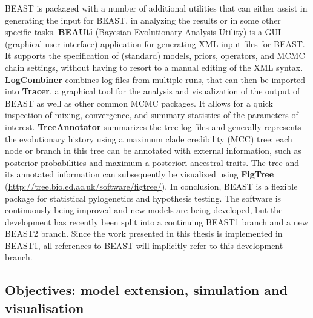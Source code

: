 BEAST is packaged with a number of additional utilities that can either assist in generating the input for BEAST, in analyzing the results or in some other specific tasks.
\textbf{BEAUti} (Bayesian Evolutionary Analysis Utility) is a  GUI (graphical user-interface) application for generating XML input files for BEAST. 
It supports the specification of (standard) models, priors, operators, and MCMC chain settings, without having to resort to a manual editing of the XML syntax.
\textbf{LogCombiner} combines log files from multiple runs, that can then be imported into \textbf{Tracer}, a graphical tool for the analysis and visualization of the output of BEAST as well as other common MCMC packages.
It allows for a quick inspection of mixing, convergence, and summary statistics of the parameters of interest.
\textbf{TreeAnnotator} summarizes the tree log files and generally represents the evolutionary history using a maximum clade credibility (MCC) tree; each node or branch in this tree can be annotated with external information, such as posterior probabilities and maximum a posteriori ancestral traits.
The tree and its annotated information can subsequently be visualized using \textbf{FigTree} (\url{http://tree.bio.ed.ac.uk/software/figtree/}). %
%
In conclusion, BEAST is a flexible package for statistical pylogenetics and hypothesis testing.
The software is continuously being improved and new models are being developed, but the development has recently been split into a continuing BEAST1 branch and a new BEAST2 branch\citep{Bouckaert2014}. 
Since the work presented in this thesis is implemented in BEAST1, all references to BEAST will implicitly refer to this development branch.

\subsection{Objectives: model extension, simulation and visualisation\label{sub:objectives}}

